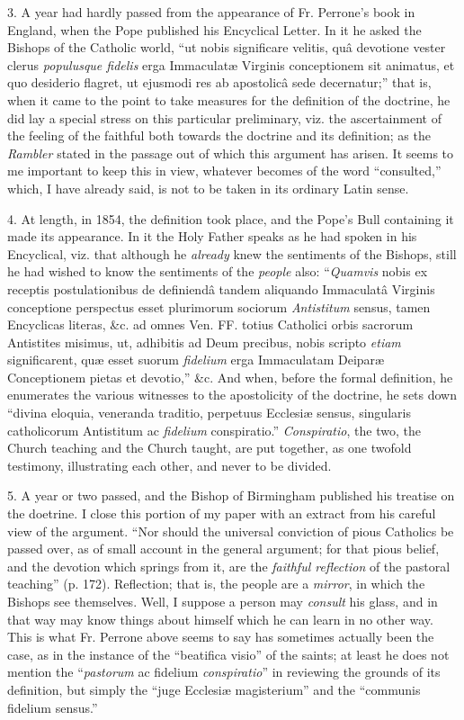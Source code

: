 3. A year had hardly passed from the appearance of
Fr. Perrone's book in England, when the Pope published his Encyclical
Letter. In it he asked the Bishops of the Catholic world, ``ut nobis
significare velitis, quâ devotione vester clerus \emph{populusque fidelis}
erga Immaculatæ Virginis conceptionem sit animatus, et quo desiderio
flagret, ut ejusmodi res ab apostolicâ sede decernatur;'' that is, when
it came to the point to take measures for the definition of the
doctrine, he did lay a special stress on this particular preliminary,
viz. the ascertainment of the feeling of the faithful both towards the
doctrine and its definition; as the \emph{Rambler} stated in the passage
out of which this argument has arisen. It seems to me important to keep
this in view, whatever becomes of the word ``consulted,'' which, I have
already said, is not to be taken in its ordinary Latin sense.

4. At length, in 1854, the definition took place,
and the Pope's Bull containing it made its appearance. In it the Holy
Father speaks as he had spoken in his Encyclical, viz. that although he \emph{already}
knew the sentiments of the Bishops, still he had wished to know the
sentiments of the \emph{people} also: ``\emph{Quamvis} nobis ex receptis
postulationibus de definiendâ tandem aliquando Immaculatâ Virginis
conceptione perspectus esset plurimorum sociorum \emph{Antistitum}
sensus, tamen Encyclicas literas, \&c. ad omnes Ven. FF. totius
Catholici orbis sacrorum Antistites misimus, ut, adhibitis ad Deum
precibus, nobis scripto \emph{etiam} significarent, quæ esset suorum \emph{fidelium}
erga Immaculatam Deiparæ Conceptionem pietas et devotio,'' \&c. And
when, before the formal definition, he enumerates the various witnesses
to the apostolicity of the doctrine, he sets down ``divina eloquia,
veneranda traditio, perpetuus Ecclesiæ sensus, singularis catholicorum
Antistitum ac \emph{fidelium} conspiratio.'' \emph{Conspiratio}, the two,
the Church teaching and the Church taught, are put together, as one
twofold testimony, illustrating each other, and never to be divided.

5. A year or two passed, and the Bishop of
Birmingham published his treatise on the doetrine. I close this portion
of my paper with an extract from his careful view of the argument. ``Nor
should the universal conviction of pious Catholics be passed over, as of
small account in the general argument; for that pious belief, and the
devotion which springs from it, are the \emph{faithful reflection} of
the pastoral teaching'' (p. 172). Reflection; that is, the people are a \emph{mirror},
in which the Bishops see themselves. Well, I suppose a person may \emph{consult}
his glass, and in that way may know things about himself which he
can learn in no other way. This is what Fr. Perrone above seems to say
has sometimes actually been the case, as in the instance of the ``beatifica
visio'' of the saints; at least he does not mention the ``\emph{pastorum}
ac fidelium \emph{conspiratio}'' in reviewing the grounds of its
definition, but simply the ``juge Ecclesiæ magisterium'' and the ``communis
fidelium sensus.''

